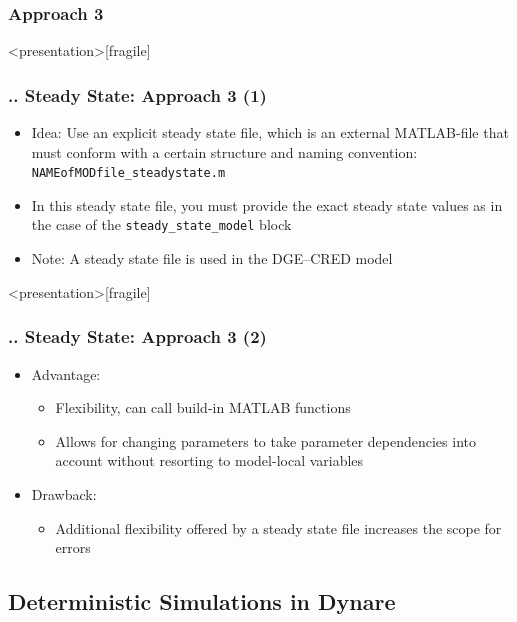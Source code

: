 \documentclass[11pt,aspectratio=169]{beamer}
\begin{document}
\subsubsection{Approach 3}
\begin{frame}<presentation>[fragile]
	\frametitle{{\thesection.\thesubsection.\thesubsubsection} Steady State: Approach 3 (1)}
	\begin{itemize}
		\item Idea: Use an explicit steady state file, which is an external MATLAB-file that must conform with a certain structure and naming convention:\\ \texttt{NAMEofMODfile\_steadystate.m}
		\item In this steady state file, you must provide the exact steady state values as in the case of the \texttt{steady\_state\_model} block
		\item Note: A steady state file is used in the DGE--CRED model
	\end{itemize}
\end{frame}
\begin{frame}<presentation>[fragile]
	\frametitle{{\thesection.\thesubsection.\thesubsubsection} Steady State: Approach 3 (2)}
	\begin{itemize}
		\item Advantage: 
		\begin{itemize}
			\item Flexibility, can call build-in MATLAB functions
			\item Allows for changing parameters to take parameter dependencies into account without resorting to model-local variables
		\end{itemize}
		\item Drawback: 
		\begin{itemize}
			\item Additional flexibility offered by a steady state file increases the scope for errors
		\end{itemize} 
	\end{itemize}
\end{frame}
\subsection{Deterministic Simulations in Dynare}
\end{document}
